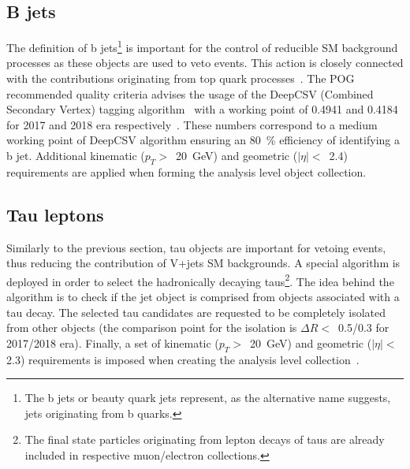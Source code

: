 \subsection{B jets}
\hspace{10pt} The definition of b jets\footnote{The b jets or beauty quark jets represent, as the alternative name suggests, jets originating from b quarks.} is important for the control of reducible SM background processes as these objects are used to veto events. This action is closely connected with the contributions originating from top quark processes~\cite{note:AN_19_257}. The POG recommended quality criteria advises the usage of the DeepCSV (Combined Secondary Vertex) tagging algorithm~\cite{paper_deepcsv} with a working point of 0.4941 and 0.4184 for 2017 and 2018 era respectively~\cite{twiki_btag_1}. These numbers correspond to a medium working point of DeepCSV algorithm ensuring an 80~\% efficiency of identifying a b jet. Additional kinematic ($p_T>$~20~GeV) and geometric ($|\eta|<$~2.4) requirements are applied when forming the analysis level object collection.
\subsection{Tau leptons}
\hspace{10pt} Similarly to the previous section, tau objects are important for vetoing events, thus reducing the contribution of V+jets SM backgrounds. A special algorithm is deployed in order to select the hadronically decaying taus\footnote{The final state particles originating from lepton decays of taus are already included in respective muon/electron collections.}. The idea behind the algorithm is to check if the jet object is comprised from objects associated with a tau decay. The selected tau candidates are requested to be completely isolated from other objects (the comparison point for the isolation is $\Delta R<$~0.5/0.3 for 2017/2018 era). Finally, a set of kinematic ($p_T>$~20~GeV) and geometric ($|\eta|<~$2.3) requirements is imposed when creating the analysis level collection~\cite{twiki_tau_pog}.

